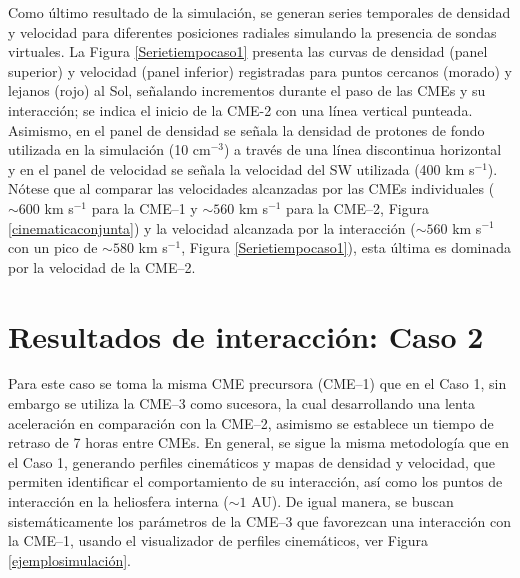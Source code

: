 Como último resultado de la simulación, se generan series temporales de densidad y velocidad para diferentes posiciones radiales simulando la presencia de sondas virtuales. La Figura \ref{Serietiempocaso1} presenta las curvas de densidad (panel superior) y velocidad (panel inferior) registradas para puntos cercanos (morado) y lejanos (rojo) al Sol, señalando incrementos durante el paso de las CMEs y su interacción; se indica el inicio de la CME-2 con una línea vertical punteada. Asimismo, en el panel de densidad se señala la densidad de protones de fondo utilizada en la simulación (10 cm$^{-3}$) a través de una línea discontinua horizontal y en el panel de velocidad se señala la velocidad del \ac{SW} utilizada (400 km s$^{-1}$). Nótese que al comparar las velocidades alcanzadas por las CMEs individuales ($\sim600$ km s$^{-1}$ para la CME--1 y $\sim560$ km s$^{-1}$ para la CME--2, Figura \ref{cinematicaconjunta}) y la velocidad alcanzada por la interacción ($\sim560$ km s$^{-1}$ con un pico de $\sim580$ km s$^{-1}$, Figura \ref{Serietiempocaso1}), esta última es dominada por la velocidad de la CME--2.


\section{Resultados de interacción: Caso 2}
Para este caso se toma la misma CME precursora (CME--1) que en el Caso 1, sin embargo se utiliza la CME--3 como sucesora, la cual desarrollando una lenta aceleración en comparación con la CME--2, asimismo se establece un tiempo de retraso de 7 horas entre CMEs. En general, se sigue la misma metodología que en el Caso 1, generando perfiles cinemáticos y mapas de densidad y velocidad, que permiten identificar el comportamiento de su interacción, así como los puntos de interacción en la heliosfera interna ($\sim1$ AU). De igual manera, se buscan sistemáticamente los parámetros de la CME--3 que favorezcan una interacción con la CME--1, usando el visualizador de perfiles cinemáticos, ver Figura \ref{ejemplosimulación}.

